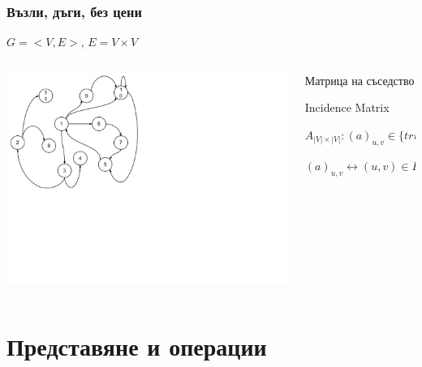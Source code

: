 \documentclass{beamer}
\begin{document}
\begin{frame}[fragile]
\frametitle{Възли, дъги, без цени}

\begin{center}
  $G=<V,E>$, $E=V \times V$
\end{center}

\begin{columns}[t]
  \begin{column}{0.55\textwidth}
    \includegraphics[width=13cm]{images/graph_numbers}
  \end{column}
  \begin{column}{0.45\textwidth}
    \begin{flushleft}

    \vspace{-250px}
      Матрица на съседство

      Incidence Matrix

      $A_{|V|\times|V|}:(a)_{u,v} \in \{true,false\}$

      $(a)_{u,v} \leftrightarrow(u,v)\in E$
      
    \end{flushleft}
  \end{column}
\end{columns}



\end{frame}

\section{Представяне и операции} 
\end{document}

